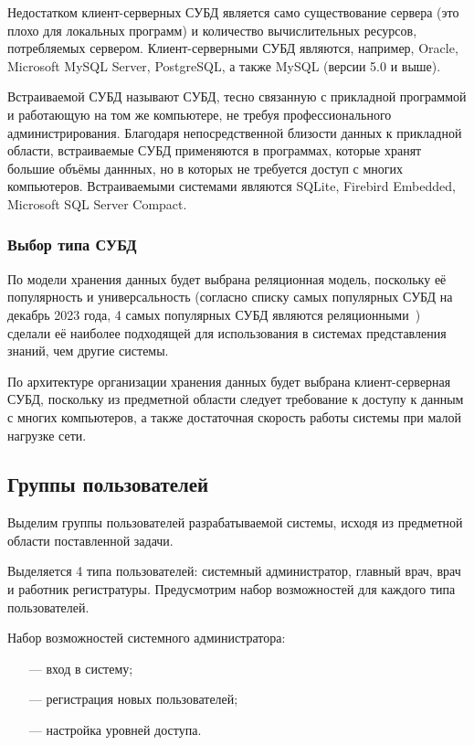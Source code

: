 Недостатком клиент-серверных СУБД является само существование сервера (это плохо для локальных программ) и количество вычислительных ресурсов, потребляемых сервером.
Клиент-серверными СУБД являются, например, Oracle, Microsoft MySQL Server, PostgreSQL, а также MySQL (версии 5.0 и выше).

Встраиваемой СУБД называют СУБД, тесно связанную с прикладной программой и работающую на том же компьютере, не требуя профессионального администрирования. 
Благодаря непосредственной близости данных к прикладной области, встраиваемые СУБД применяются в программах, которые хранят большие объёмы даннных, но в которых не требуется доступ с многих компьютеров.
Встраиваемыми системами являются SQLite, Firebird Embedded, Microsoft SQL Server Compact.


\subsubsection{Выбор типа СУБД}

По модели хранения данных будет выбрана реляционная модель, поскольку её популярность и универсальность (согласно списку самых популярных СУБД на декабрь 2023 года, 4 самых популярных СУБД являются реляционными~\cite{db-engine}) сделали её наиболее подходящей для использования в системах представления знаний, чем другие системы.

По архитектуре организации хранения данных будет выбрана \newline клиент-серверная СУБД, поскольку из предметной области следует требование к доступу к данным с многих компьютеров, а также достаточная скорость работы системы при малой нагрузке сети.

\subsection{Группы пользователей}

Выделим группы пользователей разрабатываемой системы, исходя из \linebreak предметной области поставленной задачи.

Выделяется 4 типа пользователей: системный администратор, главный врач, врач и работник регистратуры.
Предусмотрим набор возможностей для каждого типа пользователей.

Набор возможностей системного администратора:
\begin{itemize}[leftmargin=1.6\parindent]
	\item[---] вход в систему;
	\item[---] регистрация новых пользователей;
	\item[---] настройка уровней доступа.
\end{itemize}

